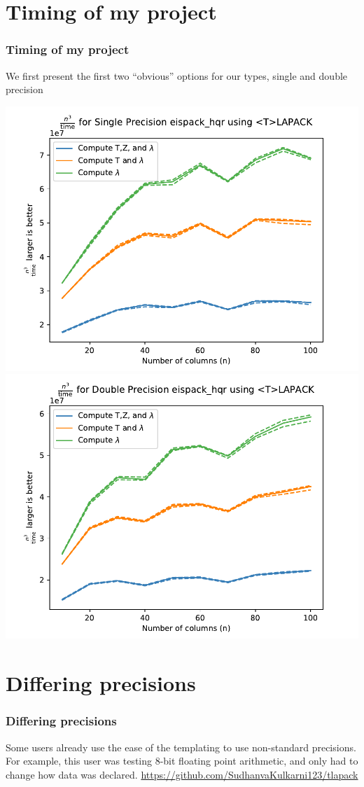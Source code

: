 \documentclass[12pt]{beamer}
\begin{document}
    \section{Timing of my project}
    \begin{frame}
        \frametitle{Timing of my project}
        We first present the first two ``obvious'' options for our types, single and double precision

        \includegraphics[width=.45\textwidth]{numericalExperiments/eispackHqrTlapackPerfSingle.pdf}
        \includegraphics[width=.45\textwidth]{numericalExperiments/eispackHqrTlapackPerfDouble.pdf}

    \end{frame}
    \section{Differing precisions}
    \begin{frame}
        \frametitle{Differing precisions}
        Some users already use the ease of the templating to use non-standard precisions. For example, this
        user was testing 8-bit floating point arithmetic, and only had to change how data was declared.
        \url{https://github.com/SudhanvaKulkarni123/tlapack}
    \end{frame}
\end{document}
